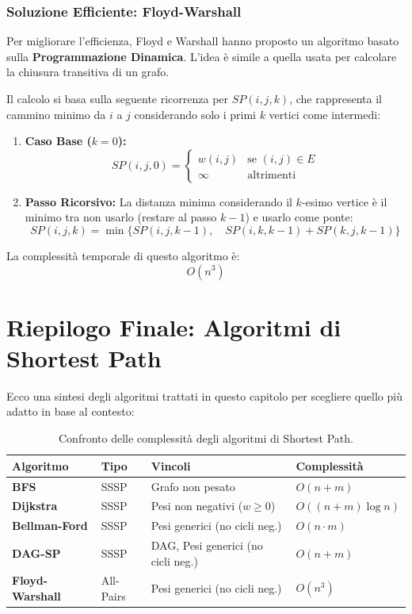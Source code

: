 \subsubsection{Soluzione Efficiente: Floyd-Warshall}
Per migliorare l'efficienza, Floyd e Warshall hanno proposto un algoritmo basato sulla \textbf{Programmazione Dinamica}. L'idea è simile a quella usata per calcolare la chiusura transitiva di un grafo.

Il calcolo si basa sulla seguente ricorrenza per $SP(i, j, k)$, che rappresenta il cammino minimo da $i$ a $j$ considerando solo i primi $k$ vertici come intermedi:

\begin{enumerate}
    \item \textbf{Caso Base ($k=0$):}
    \[
    SP(i, j, 0) = 
    \begin{cases} 
    w(i, j) & \text{se } (i, j) \in E \\
    \infty & \text{altrimenti}
    \end{cases}
    \]
    
    \item \textbf{Passo Ricorsivo:}
    La distanza minima considerando il $k$-esimo vertice è il minimo tra non usarlo (restare al passo $k-1$) e usarlo come ponte:
    \[
    SP(i, j, k) = \min \{ SP(i, j, k-1), \quad SP(i, k, k-1) + SP(k, j, k-1) \}
    \]
\end{enumerate}

\noindent
La complessità temporale di questo algoritmo è:
\[ O(n^3) \]

\section{Riepilogo Finale: Algoritmi di Shortest Path}
Ecco una sintesi degli algoritmi trattati in questo capitolo per scegliere quello più adatto in base al contesto:

\vspace{1\baselineskip}
\begin{table}[h!]
    \centering
    \caption{Confronto delle complessità degli algoritmi di Shortest Path.} 
    \label{tab:confronto_algoritmi}
    \vspace{0.2cm} %
    \begin{tabular}{|l|l|l|l|}
        \hline
        \textbf{Algoritmo} & \textbf{Tipo} & \textbf{Vincoli} & \textbf{Complessità} \\ \hline
        \textbf{BFS} & SSSP & Grafo non pesato & $O(n + m)$ \\ \hline
        \textbf{Dijkstra} & SSSP & Pesi non negativi ($w \ge 0$) & $O((n + m) \log n)$ \\ \hline
        \textbf{Bellman-Ford} & SSSP & Pesi generici (no cicli neg.) & $O(n \cdot m)$ \\ \hline
        \textbf{DAG-SP} & SSSP & DAG, Pesi generici (no cicli neg.) & $O(n + m)$ \\ \hline
        \textbf{Floyd-Warshall} & All-Pairs & Pesi generici (no cicli neg.) & $O(n^3)$ \\ \hline
    \end{tabular}
\end{table}